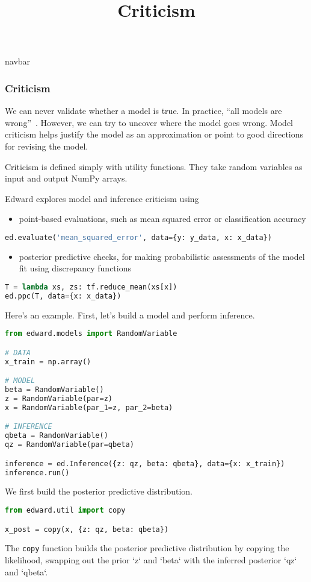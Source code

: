 \title{Criticism}

{{navbar}}

\subsubsection{Criticism}

We can never validate whether a model is true. In practice, ``all
models are wrong''~\citep{box1976science}. However, we can try to
uncover where the model goes wrong. Model criticism helps justify the
model as an approximation or point to good directions for revising the
model.

Criticism is defined simply with utility functions. They take random
variables as input and output NumPy arrays.

Edward explores model and inference criticism using
\begin{itemize}
  \item point-based evaluations, such as mean squared error or
  classification accuracy
\end{itemize}
\begin{lstlisting}[language=Python]
ed.evaluate('mean_squared_error', data={y: y_data, x: x_data})
\end{lstlisting}
\begin{itemize}
  \item posterior predictive checks, for making probabilistic
  assessments of the model fit using discrepancy functions
\end{itemize}
\begin{lstlisting}[language=Python]
T = lambda xs, zs: tf.reduce_mean(xs[x])
ed.ppc(T, data={x: x_data})
\end{lstlisting}

Here's an example. First, let's build a model and perform inference.
\begin{lstlisting}[language=Python]
from edward.models import RandomVariable

# DATA
x_train = np.array()

# MODEL
beta = RandomVariable()
z = RandomVariable(par=z)
x = RandomVariable(par_1=z, par_2=beta)

# INFERENCE
qbeta = RandomVariable()
qz = RandomVariable(par=qbeta)

inference = ed.Inference({z: qz, beta: qbeta}, data={x: x_train})
inference.run()
\end{lstlisting}
We first build the posterior predictive distribution.
\begin{lstlisting}[language=Python]
from edward.util import copy

x_post = copy(x, {z: qz, beta: qbeta})
\end{lstlisting}
The \texttt{copy} function builds the posterior predictive
distribution by copying the likelihood, swapping out the prior `z` and
`beta` with the inferred posterior `qz` and `qbeta`.

